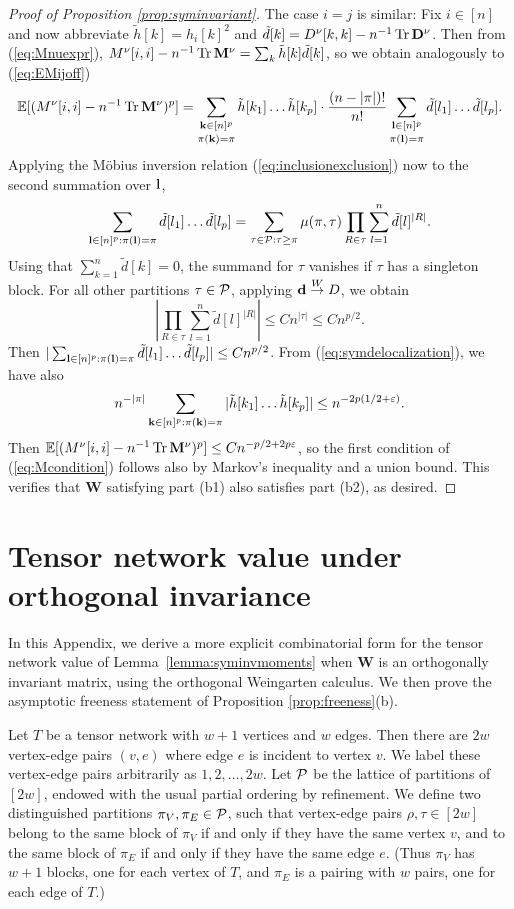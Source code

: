 \documentclass[10pt,reqno]{amsart}
\def\E{\mathbb{E}}
\def\toW{\overset{W}{\to}}
\def\bW{{\mathbf{W}}}
\def\eps{\varepsilon}
\def\Tr{\operatorname{Tr}}
\begin{document}
\begin{proof}[Proof of Proposition \ref{prop:syminvariant}]
The case $i=j$ is similar: Fix $i \in [n]$ and now abbreviate
$\tilde h[k]=h_i[k]^2$ and $\tilde d[k]=D^\nu[k,k]-n^{-1}\Tr \bD^\nu$.
Then from (\ref{eq:Mnuexpr}),
$M^\nu[i,i]-n^{-1}\Tr \bM^\nu=\sum_k \tilde h[k]\tilde d[k]$, so we obtain
analogously to (\ref{eq:EMijoff})
\[\E[(M^\nu[i,i]-n^{-1}\Tr \bM^\nu)^p]
=\mathop{\sum_{\bk \in [n]^p}}_{\pi(\bk)=\pi} \tilde h[k_1]\ldots \tilde h[k_p]
\cdot \frac{(n-|\pi|)!}{n!} 
\mathop{\sum_{\bl \in [n]^p}}_{\pi(\bl)=\pi} \tilde d[l_1]\ldots \tilde d[l_p].\]
Applying the M\"obius inversion relation (\ref{eq:inclusionexclusion}) now to
the second summation over $\mathbf{l}$,
\[\sum_{\mathbf{l} \in [n]^p:\pi(\mathbf{l})=\pi} \tilde d[l_1]\ldots \tilde d[l_p]
=\sum_{\tau \in \mathcal{P}:\tau \geq \pi} \mu(\pi,\tau)
\prod_{R \in \tau} \sum_{l=1}^n \tilde{d}[l]^{|R|}.\]
Using that $\sum_{k=1}^n \tilde d[k]=0$, the summand for $\tau$ vanishes if
$\tau$ has a singleton block. For all other partitions $\tau \in \mathcal{P}$,
applying $\bd \toW D$, we obtain
\[\left|\prod_{R \in \tau} \sum_{l=1}^n \tilde{d}[l]^{|R|}\right|
\leq Cn^{|\tau|} \leq Cn^{p/2}.\]
Then $|\sum_{\mathbf{l} \in [n]^p:\pi(\mathbf{l})=\pi} \tilde d[l_1]
\ldots \tilde d[l_p]| \leq Cn^{p/2}$.
From (\ref{eq:symdelocalization}), we have also
\[n^{-|\pi|} \sum_{\bk \in [n]^p:\pi(\bk)=\pi} |\tilde h[k_1]\ldots \tilde h[k_p]|
\leq n^{-2p(1/2+\eps)}.\]
Then $\E[(M^\nu[i,i]-n^{-1}\Tr \bM^\nu)^p] \leq Cn^{-p/2+2p\eps}$,
so the first condition of (\ref{eq:Mcondition}) follows also by Markov's
inequality and a union bound. This verifies that $\bW$ satisfying part (b1) also
satisfies part (b2), as desired.
\end{proof}


\section{Tensor network value under orthogonal invariance}\label{appendix:orthogonal}

In this Appendix, we derive a more explicit combinatorial form for the tensor
network value of Lemma~\ref{lemma:syminvmoments} when $\bW$ is an
orthogonally invariant matrix, using the orthogonal Weingarten calculus. We then
prove the asymptotic freeness statement of Proposition \ref{prop:freeness}(b).

Let $T$ be a tensor network with $w+1$ vertices and $w$ edges.
Then there are $2w$ vertex-edge pairs $(v,e)$
where edge $e$ is incident to vertex $v$. We label these vertex-edge pairs
arbitrarily as $1,2,\ldots,2w$. Let $\mathcal{P}$ be the lattice of partitions
of $[2w]$, endowed with the usual partial ordering by refinement.
We define two distinguished partitions $\pi_V,\pi_E \in \mathcal{P}$, such that
vertex-edge pairs $\rho,\tau \in [2w]$ belong
to the same block of $\pi_V$ if and only if they have the same vertex $v$, and
to the same block of $\pi_E$ if and only if they have the same edge $e$. (Thus
$\pi_V$ has $w+1$ blocks, one for each vertex of $T$, and $\pi_E$ is a pairing
with $w$ pairs, one for each edge of $T$.)
\end{document}
